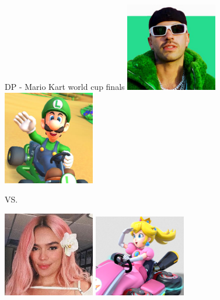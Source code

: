 \documentclass{beamer}
\begin{document}
\begin{frame}{DP - Mario Kart world cup finals}
	\centering
	\includegraphics[width=0.3\textwidth]{feid.png}
	\includegraphics[width=0.3\textwidth]{luigi.png}

	VS.

	\medskip
	\includegraphics[width=0.3\textwidth]{karolg.png}
	\includegraphics[width=0.3\textwidth]{peach.png}
\end{frame}
\end{document}

